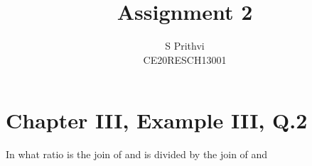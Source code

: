 \documentclass[journal,12pt,twocolumn]{IEEEtran}
\begin{document}
\def\putbox#1#2#3{\makebox[0in][l]{\makebox[#1][l]{}\raisebox{\baselineskip}[0in][0in]{\raisebox{#2}[0in][0in]{#3}}}}
     \def\rightbox#1{\makebox[0in][r]{#1}}
     \def\centbox#1{\makebox[0in]{#1}}
     \def\topbox#1{\raisebox{-\baselineskip}[0in][0in]{#1}}
     \def\midbox#1{\raisebox{-0.5\baselineskip}[0in][0in]{#1}}
\vspace{3cm}
\title{Assignment 2}
\author{S Prithvi \\ CE20RESCH13001}
\maketitle
\newpage
\bigskip
\renewcommand{\thefigure}{\theenumi}
\renewcommand{\thetable}{\theenumi}
\section{Chapter III, Example III, Q.2}
In what ratio is the join of  and  is divided by the join of  and 
\end{document}
